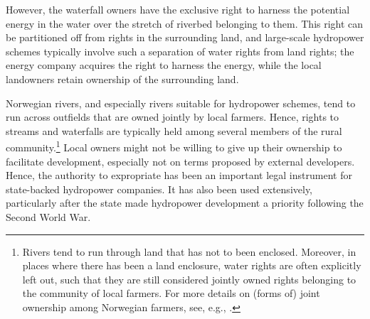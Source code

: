 
However, the waterfall owners have the exclusive right to harness the potential energy in the water over the stretch of riverbed belonging to them. This right can be partitioned off from rights in the surrounding land, and large-scale hydropower schemes typically involve such a separation of water rights from land rights; the energy company acquires the right to harness the energy, while the local landowners retain ownership of the surrounding land.

Norwegian rivers, and especially rivers suitable for hydropower schemes, tend to run across outfields that are owned jointly by local farmers. Hence, rights to streams and waterfalls are typically held among several members of the rural community.\footnote{Rivers tend to run through land that has not to been enclosed. Moreover, in places where there has been a land enclosure, water rights are often explicitly left out, such that they are still considered jointly owned rights belonging to the community of local farmers. For more details on (forms of) joint ownership among Norwegian farmers, see, e.g., \cite[570]{stenseth07a}.} Local owners might not be willing to give up their ownership to facilitate development, especially not on terms proposed by external developers. Hence, the authority to expropriate has been an important legal instrument for state-backed hydropower companies. It has also been used extensively, particularly after the state made hydropower development a priority following the Second World War.

